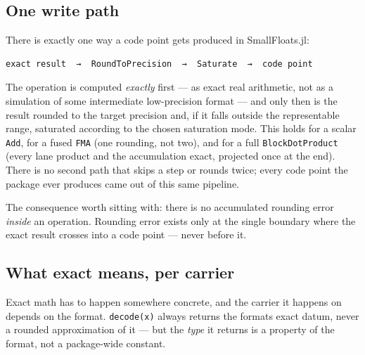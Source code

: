 \subsection{One write path}



\label{6607324653425258239}{}


There is exactly one way a code point gets produced in SmallFloats.jl:




\nopagebreak[4]
\begin{verbatim}
exact result  →  RoundToPrecision  →  Saturate  →  code point
\end{verbatim}



The operation is computed \emph{exactly} first — as exact real arithmetic, not as a simulation of some intermediate low-precision format — and only then is the result rounded to the target precision and, if it falls outside the representable range, saturated according to the chosen saturation mode. This holds for a scalar \texttt{Add}, for a fused \texttt{FMA} (one rounding, not two), and for a full \texttt{BlockDotProduct} (every lane product and the accumulation exact, projected once at the end). There is no second path that skips a step or rounds twice; every code point the package ever produces came out of this same pipeline.



The consequence worth sitting with: there is no accumulated rounding error \emph{inside} an operation. Rounding error exists only at the single boundary where the exact result crosses into a code point — never before it.



\subsection{What {\textquotedbl}exact{\textquotedbl} means, per carrier}



\label{9135858451050429722}{}


{\textquotedbl}Exact math{\textquotedbl} has to happen somewhere concrete, and the carrier it happens on depends on the format. \texttt{decode(x)} always returns the format{\textquotesingle}s exact datum, never a rounded approximation of it — but the \emph{type} it returns is a property of the format, not a package-wide constant.



